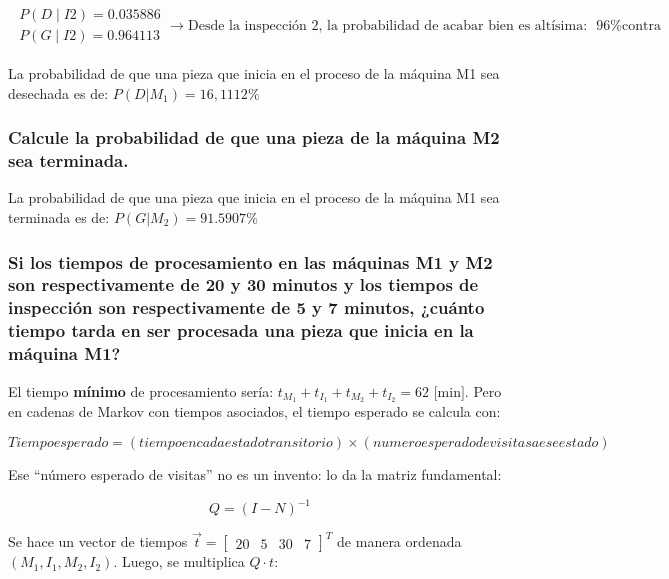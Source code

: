 \documentclass[11pt]{article}
\begin{document}
\begin{align*}
\begin{matrix} 
P(D∣I2)=0.035886 \\
P(G∣I2)=0.964113
\end{matrix}
\to \text{Desde la inspección 2, la probabilidad de acabar bien es altísima: ~96\% contra ~4\% de desecho.}
\end{align*}


La probabilidad de que una pieza que inicia en el proceso de la máquina M1 sea desechada es de: $P(D|M_1)=16,1112\%$  

\subsubsection{Calcule la probabilidad de que una pieza de la máquina M2 sea terminada.}

La probabilidad de que una pieza que inicia en el proceso de la máquina M1 sea terminada es de: $P(G|M_2)=91.5907\%$  


\subsubsection{Si los tiempos de procesamiento en las máquinas M1 y M2 son respectivamente de 20 y 30 minutos y los tiempos de inspección son respectivamente de 5 y 7 minutos, ¿cuánto tiempo tarda en ser procesada una pieza que inicia en la máquina M1?}

El tiempo \textbf{mínimo} de procesamiento sería: $t_{M_1} + t_{I_1} + t_{M_2} + t_{I_2} = 62 \text{ [min]}$. Pero en cadenas de Markov con tiempos asociados, el tiempo esperado se calcula con:

\[ Tiempo esperado=(tiempo en cada estado transitorio)\times(numero esperado de visitas a ese estado) \]

Ese “número esperado de visitas” no es un invento: lo da la matriz fundamental:

\[ Q = (I-N)^{-1} \]

Se hace un vector de tiempos $\vec{t} = \begin{bmatrix} 20 & 5 & 30 & 7 \end{bmatrix}^T$ de manera ordenada $(M_1, I_1, M_2, I_2)$. Luego, se multiplica $Q \cdot t$:
\end{document}
